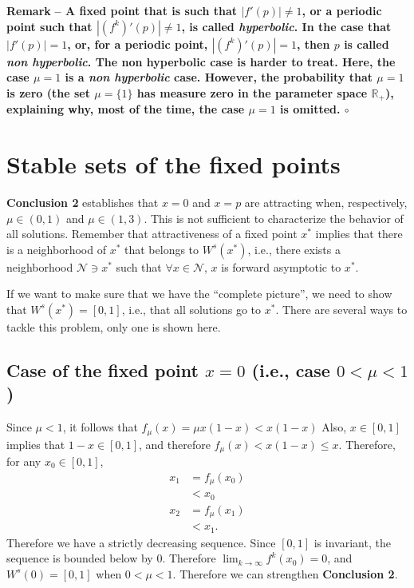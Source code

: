 \documentclass[12pt]{article}
\theoremstyle{plain}
\newenvironment{remark}{\vskip0.2cm\par\noindent\begin{small}\bf Remark\,\,\rm --}{\hfill{$\circ$}\end{small}\par\vskip0.25cm}
\def\IR{\mathbb{R}}
\begin{document}
\begin{remark}
A fixed point that is such that $|f'(p)|\neq 1$, or a periodic point such that $|(f^k)'(p)|\neq 1$, is called \emph{hyperbolic}. In the case that $|f'(p)|=1$, or, for a periodic point, $|(f^k)'(p)|=1$, then $p$ is called \emph{non hyperbolic}. The non hyperbolic case is harder to treat. Here, the case $\mu=1$ is a \emph{non hyperbolic} case. However, the probability that $\mu=1$ is zero (the set $\mu=\{1\}$ has measure zero in the parameter space $\IR_+$), explaining why, most of the time, the case $\mu=1$ is omitted.
\end{remark}



\section{Stable sets of the fixed points}
{\bf Conclusion 2} establishes that $x=0$ and $x=p$ are attracting when, respectively, $\mu\in(0,1)$ and $\mu\in(1,3)$. This is not sufficient to characterize the behavior of all solutions. Remember that attractiveness of a fixed point $x^*$ implies that there is a neighborhood of $x^*$ that belongs to $W^s(x^*)$, i.e., there exists 
a neighborhood $\mathcal{N}\ni x^*$ such that $\forall x\in\mathcal{N}$, $x$ is forward asymptotic to $x^*$.

If we want to make sure that we have the ``complete picture'', we need to show that $W^s(x^*)=[0,1]$, i.e., that all solutions go to $x^*$. There are several ways to tackle this problem, only one is shown here.

\subsection{Case of the fixed point $x=0$ (i.e., case $0<\mu<1$)}
Since $\mu<1$, it follows that $f_\mu(x)=\mu x(1-x)<x(1-x)$ Also, $x\in[0,1]$ implies that $1-x\in[0,1]$, and therefore $f_\mu(x)<x(1-x)\leq x$. Therefore, for any $x_0\in[0,1]$,
\begin{align*}
x_1 &= f_\mu(x_0) \\
&< x_0 \\
x_2 &= f_\mu(x_1) \\
& < x_1.
\end{align*}
Therefore we have a strictly decreasing sequence. Since $[0,1]$ is invariant, the sequence is bounded below by $0$. Therefore $\lim_{k\to\infty}f^k(x_0)=0$, and $W^s(0)=[0,1]$ when $0<\mu<1$. Therefore we can strengthen {\bf Conclusion 2}.
\end{document}

